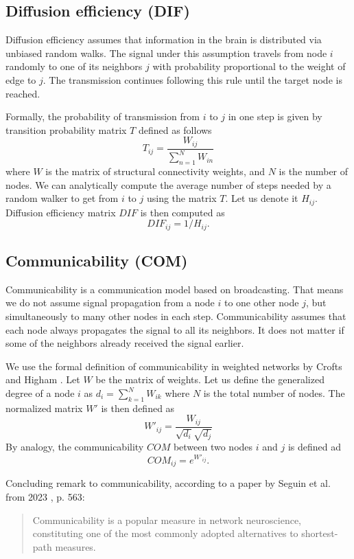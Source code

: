 \subsection{Diffusion efficiency (DIF)}

Diffusion efficiency assumes that information in the brain is distributed via unbiased random walks. The signal under this assumption travels from node $i$ randomly to one of its neighbors $j$ with probability proportional to the weight of edge to $j$. The transmission continues following this rule until the target node is reached. \cite{seguin_communication_2023,seguin_brain_2023}

Formally, the probability of transmission from $i$ to $j$ in one step is given by transition probability matrix $T$ defined as follows 
$$
T_{ij} = \frac{W_{ij}}{\sum_{n=1}^N W_{in}}
$$
where $W$ is the matrix of structural connectivity weights, and $N$ is the number of nodes. We can analytically compute the average number of steps needed by a random walker to get from $i$ to $j$ using the matrix $T$. Let us denote it $H_{ij}$. Diffusion efficiency matrix $DIF$ is then computed as 
$$DIF_{ij}=1/H_{ij}.$$

\subsection{Communicability (COM)}

Communicability is a communication model based on broadcasting. That means we do not assume signal propagation from a node $i$ to one other node $j$, but simultaneously to many other nodes in each step. Communicability assumes that each node always propagates the signal to all its neighbors. It does not matter if some of the neighbors already received the signal earlier. \cite{seguin_communication_2023,seguin_brain_2023}

We use the formal definition of communicability in weighted networks by Crofts and Higham \cite{crofts_weighted_2009}. Let $W$ be the matrix of weights. Let us define the generalized degree of a node $i$ as $d_i = \sum_{k=1}^N W_{ik}$ where $N$ is the total number of nodes. The normalized matrix $W'$ is then defined as 
$$
W'_{ij} = \frac{W_{ij}}{\sqrt{d_i}\sqrt{d_j}}
$$
By analogy, the communicability $COM$ between two nodes $i$ and $j$ is defined ad
$$
COM_{ij} = e^{W'_{ij}}.
$$

Concluding remark to communicability, according to a paper by Seguin et al. from 2023 \cite{seguin_brain_2023}, p. 563:
\begin{quote}
Communicability is a popular measure in network neuroscience, constituting one of the most commonly adopted alternatives to shortest-path measures.
\end{quote}

